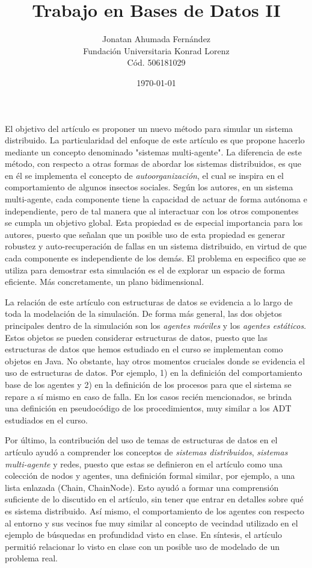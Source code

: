\documentclass[11pt]{article}
\author{Jonatan Ahumada Fernández\\
Fundación Universitaria Konrad Lorenz\\
Cód. 506181029}
\date{\today}
\title{Trabajo en Bases de Datos II}
\begin{document}
\maketitle
\noindent
El objetivo del artículo es proponer un nuevo método para simular un sistema distribuido. La particularidad
del enfoque de este artículo es que propone hacerlo mediante un concepto denominado "sistemas multi-agente".
La diferencia de este método, con respecto a otras formas de abordar los sistemas distribuidos, es que en él se implementa
el concepto de \emph{autoorganización}, el cual se inspira en el comportamiento de algunos insectos sociales. Según los autores, 
en un sistema multi-agente, cada componente tiene la capacidad de actuar de forma autónoma e independiente, pero de tal manera
que al interactuar con los otros componentes se cumpla un objetivo global. Esta propiedad es de especial importancia para los autores, 
puesto que señalan que un posible uso de esta propiedad es generar robustez y auto-recuperación de fallas en un sistema distribuido, 
en virtud de que cada componente es independiente de los demás. El problema en especifico que se utiliza para demostrar esta simulación es el de explorar un espacio de forma eficiente.
Más concretamente, un plano bidimensional.

La relación de este artículo con estructuras de datos se evidencia a lo largo de toda la modelación de la simulación. De forma 
más general, las dos objetos principales dentro de la simulación son los \emph{agentes móviles} y los \emph{agentes estáticos}. Estos objetos
 se pueden considerar estructuras de datos, puesto que las estructuras de datos que hemos estudiado en el curso 
se implementan como objetos en Java. No obstante, hay otros momentos cruciales donde se evidencia el uso de estructuras de datos. Por ejemplo, 1)
en la definición del comportamiento base de los agentes y 2) en la definición de los procesos para que el sistema se repare a sí mismo  en caso de falla.
En los casos recién mencionados, se brinda una definición en pseudocódigo de los procedimientos, muy similar a los ADT
estudiados en el curso. 

Por último, la contribución del uso de temas de estructuras de datos en el artículo ayudó a comprender los conceptos de \emph{sistemas distribuidos}, \emph{sistemas multi-agente}  y redes, puesto que estas se definieron en el artículo como una colección de nodos y agentes, una definición formal 
similar, por ejemplo, a una lista enlazada (Chain, ChainNode). Esto ayudó a formar una comprensión suficiente de lo discutido en el artículo, sin tener que entrar en detalles sobre qué es sistema distribuido. Así mismo, 
el comportamiento de los agentes con respecto al entorno y sus vecinos fue muy similar al concepto de vecindad utilizado en el ejemplo de búsquedas en profundidad visto en clase. 
En síntesis, el artículo permitió relacionar lo visto en clase con un posible uso de modelado de un problema real. 
\end{document}
